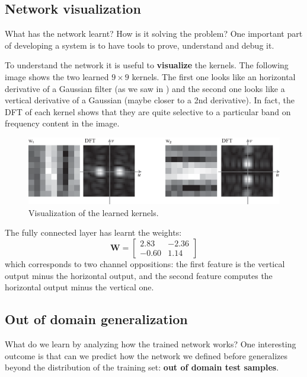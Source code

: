 \subsection{Network visualization}

What has the network learnt? How is it solving the problem? One important part of developing a system is to have tools to prove, understand and debug it. 

To understand the network it is useful to {\bf visualize} the kernels. The following image shows the two learned $9 \times 9$ kernels. The first one looks like an horizontal derivative of a Gaussian filter (as we saw in \chap{\ref{chapter:image_derivatives}}) and the second one looks like a vertical derivative of a Gaussian (maybe closer to a 2nd derivative). In fact, the DFT of each kernel shows that they are quite selective to a particular band on frequency content in the image.  

\begin{figure}
\includegraphics[width=1.0\linewidth]{./figures/convolutional_neural_nets/oriented_bars_cnn_kernels.eps}
\caption{Visualization of the learned kernels.}
\end{figure}

The fully connected layer has learnt the weights:
\begin{equation}
\mathbf{W} =  
\left[
\begin{array}{cc}
2.83 & -2.36  \\
-0.60 & 1.14  
\end{array}
\right]
\end{equation}
which corresponds to two channel oppositions: the  first feature is the vertical output minus the horizontal output, and the second feature computes the horizontal output minus the vertical one.  

\subsection{Out of domain generalization}

What do we learn by analyzing how the trained network works? One interesting outcome is that can we predict how the network we defined before generalizes beyond the distribution of the training set: {\bf out of domain test samples}. 

